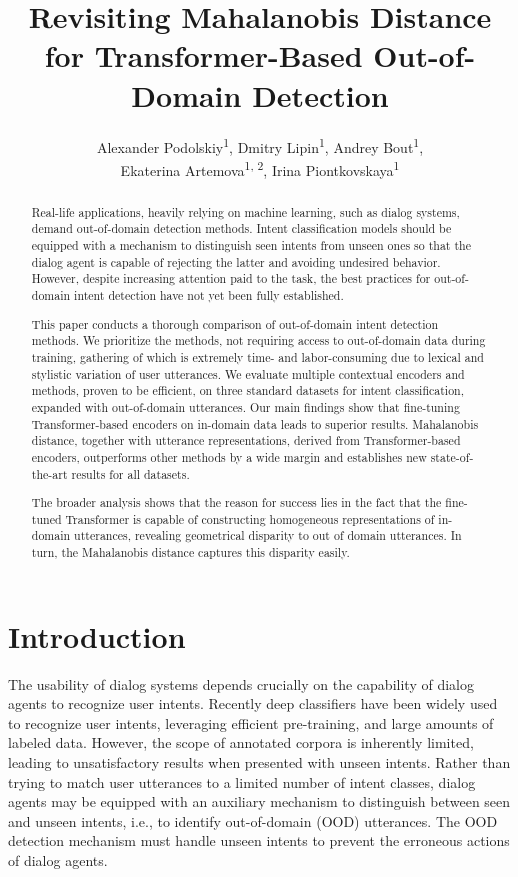 \documentclass[letterpaper, final]{article} %
\title{Revisiting Mahalanobis Distance for Transformer-Based Out-of-Domain Detection}
\author{
Alexander Podolskiy\textsuperscript{\rm 1}, Dmitry Lipin\textsuperscript{\rm 1}, Andrey Bout\textsuperscript{\rm 1},\\
Ekaterina Artemova\textsuperscript{\rm 1, 2},  Irina Piontkovskaya\textsuperscript{\rm 1}\\
}
\begin{document}
\maketitle

\begin{abstract}
Real-life applications, heavily relying on machine learning, such as dialog systems, demand out-of-domain detection methods. Intent classification models should be equipped with a mechanism to distinguish seen intents from unseen ones so that the dialog agent is capable of rejecting the latter and avoiding undesired behavior. However, despite increasing attention paid to the task, the best practices for out-of-domain intent detection have not yet been fully established.

This paper conducts a thorough comparison of out-of-domain intent detection methods. We prioritize the methods, not requiring access to out-of-domain data during training, gathering of which is extremely time- and labor-consuming due to lexical and stylistic variation of user utterances. We evaluate multiple contextual encoders and methods, proven to be efficient, on three standard datasets for intent classification, expanded with out-of-domain utterances. Our main findings show that fine-tuning Transformer-based encoders on in-domain data leads to superior results. Mahalanobis distance, together with utterance representations, derived from Transformer-based encoders, outperforms other methods by a wide margin and establishes new state-of-the-art results for all datasets.

The broader analysis shows that the reason for success lies in the fact that the fine-tuned Transformer is capable of constructing homogeneous representations of in-domain utterances, revealing geometrical disparity to out of domain utterances. In turn, the Mahalanobis distance captures this disparity easily.



\end{abstract}

\section{Introduction}

The usability of dialog systems depends crucially on the capability of dialog agents to recognize user intents. Recently deep classifiers have been widely used to recognize user intents, leveraging efficient pre-training, and large amounts of labeled data. However, the scope of annotated corpora is inherently limited, leading to unsatisfactory results when presented with unseen intents. Rather than trying to match user utterances to a limited number of intent classes, dialog agents may be equipped with an auxiliary mechanism to distinguish between seen and unseen intents, i.e., to identify out-of-domain (OOD) utterances. The OOD detection mechanism must handle unseen intents to prevent the erroneous actions of dialog agents.
\end{document}
